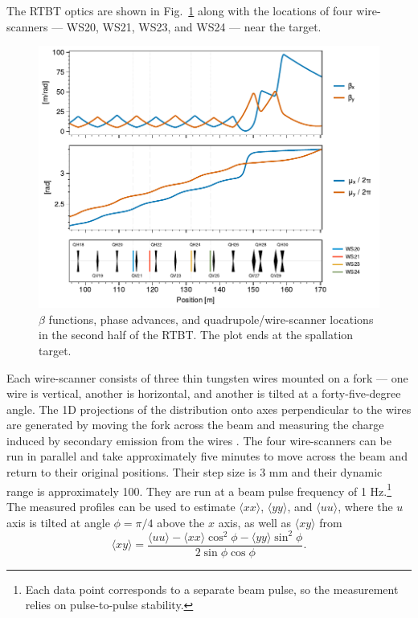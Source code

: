The RTBT optics are shown in Fig.~\ref{fig:rtbt_optics} along with the locations of four wire-scanners — WS20, WS21, WS23, and WS24 — near the target.
%
\begin{figure}[!p]
    \includegraphics[width=\textwidth]{Images/chapter4/rtbt_optics.pdf}
    \caption{$\beta$ functions, phase advances, and quadrupole/wire-scanner locations in the second half of the RTBT. The plot ends at the spallation target.}
    \label{fig:rtbt_optics}
\end{figure}
%
Each wire-scanner consists of three thin tungsten wires mounted on a fork — one wire is vertical, another is horizontal, and another is tilted at a forty-five-degree angle. The 1D projections of the distribution onto axes perpendicular to the wires are generated by moving the fork across the beam and measuring the charge induced by secondary emission from the wires \cite{Henderson2014}. The four wire-scanners can be run in parallel and take approximately five minutes to move across the beam and return to their original positions. Their step size is 3 mm and their dynamic range is approximately 100. They are run at a beam pulse frequency of 1 Hz.\footnote{Each data point corresponds to a separate beam pulse, so the measurement relies on pulse-to-pulse stability.} The measured profiles can be used to estimate $\langle{xx}\rangle$, $\langle{yy}\rangle$, and $\langle{uu}\rangle$, where the $u$ axis is tilted at angle $\phi = \pi/4$ above the $x$ axis, as well as $\langle{xy}\rangle$ from
%
\begin{equation}
    \langle{xy}\rangle = \frac{\langle{uu}\rangle - \langle{xx}\rangle \cos^2\phi - \langle{yy}\rangle \sin^2\phi}{2\sin\phi\cos\phi}
    .
\end{equation}
%


